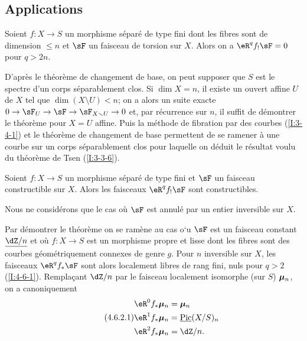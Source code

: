 \subsection{Applications}\label{I:4-6}





\begin{theorem}[d'annulation]\label{I:4-6-1}
Soient $f:X\to S$ un morphisme séparé de type fini dont les fibres sont de 
dimension $\leqslant n$ et $\sF$ un faisceau de torsion sur $X$. Alors on a 
$\eR^q f_! \sF = 0$ pour $q>2 n$. 
\end{theorem}

D'après le théorème de changement de base, on peut supposer que $S$ est 
le spectre d'un corps séparablement clos. Si $\dim X = n$, il existe un 
ouvert affine $U$ de $X$ tel que $\dim(X\setminus U) < n$; on a alors un suite 
exacte $0\to \sF_U \to \sF \to \sF_{X\setminus U} \to 0$ et, par récurrence sur $n$, 
il suffit de démontrer le théorème pour $X=U$ affine. Puis la méthode de 
fibration par des courbes (\ref{I:3-4-1}) et le théorème de changement de 
base permettent de se ramener à une courbe sur un corps séparablement clos 
pour laquelle on déduit le résultat voulu du théorème de Tsen 
(\ref{I:3-3-6}). 





\begin{theorem}[de finitude]\label{I:4-6-2}
Soient $f:X\to S$ un morphisme séparé de type fini et $\sF$ un faisceau 
constructible sur $X$. Alors les faisceaux $\eR^q f_! \sF$ sont constructibles. 
\end{theorem}

Nous ne considérons que le cas où $\sF$ est annulé par un entier inversible 
sur $X$. 

Par démontrer le théorème on se ramène au cas o`u $\sF$ est un faisceau 
constant $\const{\dZ/n}$ et où $f:X\to S$ est un morphisme propre et lisse 
dont les fibres sont des courbes géométriquement connexes de genre $g$. 
Pour $n$ inversible sur $X$, les faisceaux $\eR^q f_* \sF$ sont alors localement 
libres de rang fini, nuls pour $q>2$ (\ref{I:4-6-1}). Remplaçant $\dZ/n$ par le 
faisceau localement isomorphe (sur $S$) ${\bm\mu}_n$, on a canoniquement 
\begin{equation*}\tag{4.6.2.1}\label{I:eq:4-6-2-1}
\begin{aligned}
  \eR^0 f_* \dmu_n &= \dmu_n \\
  \eR^1 f_* \dmu_n &= \const\pic(X/S)_n \\
  \eR^2 f_* \dmu_n &= \dZ/n \text{.}
\end{aligned}
\end{equation*}





